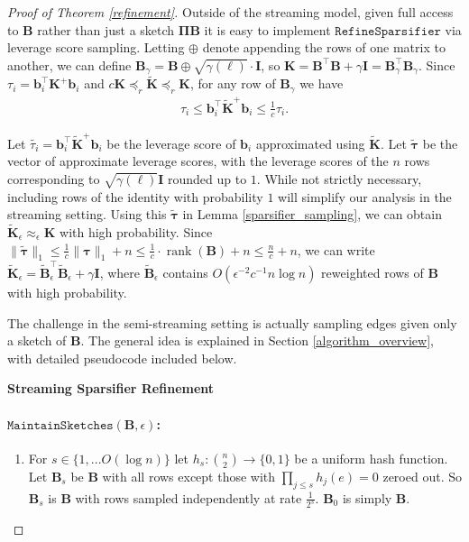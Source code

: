 \documentclass[11pt]{article}
\DeclareMathOperator*{\rank}{rank}
\newcommand{\norm}[1]{\|#1\|}
\newcommand{\bs}[1]{\boldsymbol{#1}}
\newcommand{\bv}[1]{\mathbf{#1}}
\newcommand{\refine}{\texttt{RefineSparsifier}}
\newcommand{\maintain}{\texttt{MaintainSketches}}
\begin{document}
\begin{proof}[Proof of Theorem \ref{refinement}]

Outside of the streaming model, given full access to $\bv{B}$ rather than just a sketch $\bv{\Pi}\bv{B}$ it is easy to implement $\refine$ via leverage score sampling. Letting $\oplus$ denote appending the rows of one matrix to another, we can define $\bv{B}_\gamma = \bv{B} \oplus \sqrt{\gamma(\ell)} \cdot \bv{I}$, so $\bv{K} = \bv{B}^\top \bv{B} + \gamma \bv{I} = \bv{B}_\gamma^\top \bv{B}_\gamma$. Since $\tau_i = \bv{b}_i^\top  \bv{ K}^+ \bv{b}_i$ and $c\bv{K} \preceq_r \bv{\tilde K} \preceq_r \bv{K}$, for any row of $\bv{B}_\gamma$ we have
\begin{align*}
 \tau_i \le \bv{b}_i^\top \bv{\tilde K}^+ \bv{b}_i \le \frac{1}{c}\tau_i .
\end{align*}

Let $\tilde{\tau_i} = \bv{b}_i^\top \bv{\tilde K}^+ \bv{b}_i$ be the leverage score of $\bv{b}_i$ approximated using $\bv{\tilde K}$. Let $\bs{\tilde \tau}$ be the vector of approximate leverage scores, with the leverage scores of the $n$ rows corresponding to $\sqrt{\gamma(\ell)} \bv{I}$ rounded up to $1$. While not strictly necessary, including rows of the identity with probability $1$ will simplify our analysis in the streaming setting. Using this $\bs{\tilde \tau}$ in Lemma \ref{sparsifier_sampling}, we can obtain $\bv{\tilde K}_\epsilon \approx_\epsilon \bv{K}$ with high probability. Since $\norm{\bs{\tilde \tau}}_1 \le \frac{1}{c}\norm{\bs{\tau}}_1 + n \le \frac{1}{c} \cdot \rank(\bv{B}) + n \le \frac{n}{c} + n$, we can write  $\bv{\tilde K}_\epsilon = \bv{\tilde B}_\epsilon^\top \bv{\tilde B}_\epsilon + \gamma \bv{I}$, where $\bv{\tilde B}_\epsilon$ contains $O(\epsilon^{-2}c^{-1} n\log n)$ reweighted rows of $\bv{B}$ with high probability.

The challenge in the semi-streaming setting is actually sampling edges given only a sketch of $\bv{B}$. The general idea is explained in Section \ref{algorithm_overview}, with detailed pseudocode included below. 
\begin{framed}{\noindent\bfseries Streaming Sparsifier Refinement}


\paragraph{$\maintain(\bv{B}, \epsilon)$:}
\begin{enumerate}

\item For $s \in \{1,...O(\log n)\}$ let $h_s: {n \choose 2} \rightarrow \{0,1 \}$ be a uniform hash function. Let $\bv{B}_s$ be $\bv{B}$ with all rows except those with $\prod_{j \le s} h_j(e) = 0$ zeroed out. So $\bv{B}_s$ is $\bv{B}$ with rows sampled independently at rate $\frac{1}{2^s}$. $\bv{B}_0$ is simply $\bv{B}$.  


\end{enumerate}
\end{framed}
\end{proof}
\end{document}
